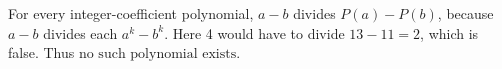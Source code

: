 For every integer-coefficient polynomial, $a-b$ divides $P(a)-P(b)$, because $a-b$ divides each $a^k-b^k$. Here 4 would have to divide $13-11=2$, which is false. Thus $\boxed{\text{no such polynomial exists}}$.

